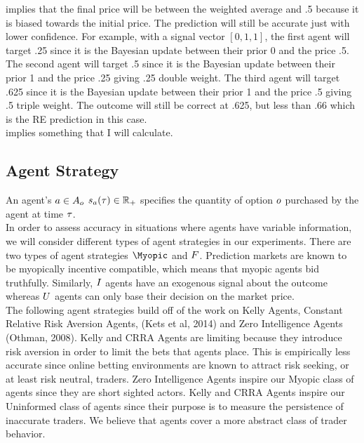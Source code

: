  implies that the final price will be between the weighted average and .5 because it is biased towards the initial price. The prediction will still be accurate just with lower confidence. For example, with a signal vector $\left[0,1,1\right]$, the first agent will target .25 since it is the Bayesian update between their prior 0 and the price .5. The second agent will target .5 since it is the Bayesian update between their prior 1 and the price .25 giving .25 double weight. The third agent will target .625 since it is the Bayesian update between their prior 1 and the price .5 giving .5 triple weight. The outcome will still be correct at .625, but less than .66 which is the RE prediction in this case.\\

 implies something that I will calculate.\\

\subsection{Agent Strategy}
An agent's $a\in A_o$  
$s_a(\tau) \in \mathbb{R}_+$ specifies the quantity of option 
$o$ purchased by the agent at time $\tau$.\\

In order to assess accuracy in situations where agents have variable information, we will consider different types of agent strategies in our experiments. There are two types of agent strategies  $\Myopic$ and  $F$. Prediction markets are known to be myopically incentive compatible, which means that myopic agents bid truthfully. Similarly,  $I$ agents have an exogenous signal about the outcome whereas  $U$ agents can only base their decision on the market price. \\

The following agent strategies build off of the work on Kelly Agents, Constant Relative Risk Aversion Agents, (Kets et al, 2014) and Zero Intelligence Agents (Othman, 2008). Kelly and CRRA Agents are limiting because they introduce risk aversion in order to limit the bets that agents place. This is empirically less accurate since online betting environments are known to attract risk seeking, or at least risk neutral, traders. Zero Intelligence Agents inspire our Myopic class of agents since they are short sighted actors. Kelly and CRRA Agents inspire our Uninformed class of agents since their purpose is to measure the persistence of inaccurate traders. We believe that  agents cover a more abstract class of trader behavior.\\

